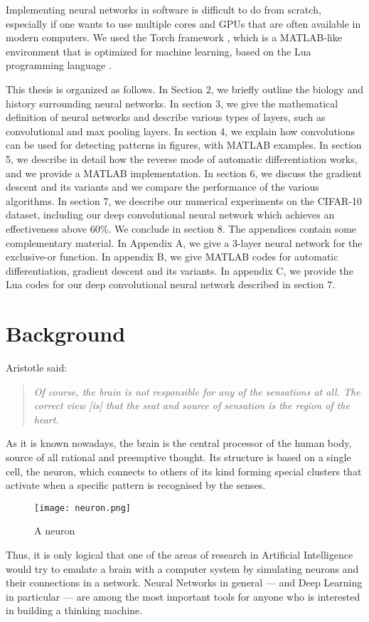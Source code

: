 \documentclass[titlepage]{article}
\theoremstyle{plain}
\theoremstyle{definition}
\begin{document}
		Implementing neural networks in software is difficult to do from scratch, especially if one wants to use multiple cores and GPUs that are often available in modern computers. We used the Torch framework \cite{Collobert}, which is a MATLAB-like environment that is optimized for machine learning, based on the Lua programming language \cite{Miller}.
		
		This thesis is organized as follows.  In Section 2, we briefly outline the biology and history surrounding neural networks. In section 3, we give the mathematical definition of neural networks and describe various types of layers, such as convolutional and max pooling layers. In section 4, we explain how convolutions can be used for detecting patterns in figures, with MATLAB examples. In section 5, we describe in detail how the reverse mode of automatic differentiation works, and we provide a MATLAB implementation. In section 6, we discuss the gradient descent and its variants and we compare the performance of the various algorithms. In section 7, we describe our numerical experiments on the CIFAR-10 dataset, including our deep convolutional neural network which achieves an effectiveness above 60\%. We conclude in section 8. The appendices contain some complementary material. In Appendix A, we give a 3-layer neural network for the exclusive-or function. In appendix B, we give MATLAB codes for automatic differentiation, gradient descent and its variants. In appendix C, we provide the Lua codes for our deep convolutional neural network described in section 7.					
		
	\section{Background}\label{Bground}
		Aristotle \cite{Gross} said: 
		\begin{quote}
			\textit{Of course, the brain is not responsible for any of the sensations at all. The correct view [is] that the seat and source of sensation is the region of the heart.}  
		\end{quote}
		As it is known nowadays, the brain is the central processor of the human body, source of all rational and preemptive thought. Its structure is based on a single cell, the neuron, which connects to others of its kind forming special clusters that activate when a specific pattern is recognised by the senses.
		\begin{figure}[H]
			\centering
			\texttt{[image: neuron.png]}
			\caption{A neuron \cite{Kriesel}}
			\label{fig:neuron1}
		\end{figure}
		Thus, it is only logical that one of the areas of research in Artificial Intelligence would try to emulate a brain with a computer system by simulating neurons and their connections in a network. Neural Networks in general --- and Deep Learning in particular --- are among the most important tools for anyone who is interested in building a thinking machine.\\
		
\end{document}
